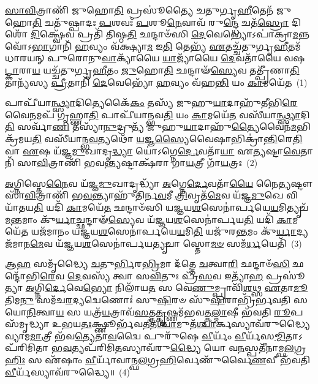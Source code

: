 \setcounter{anuvakam}{0}
\-\ul{𑌸𑌾}\-\-\ul{𑌵𑌿}\-𑌤𑍍𑌰𑌾𑌣𑌿᳴ 𑌜𑍁𑌹𑍋\-\ul{𑌤𑌿} 𑌪𑍍𑌰𑌸𑍂॑𑌤𑍍𑌯𑍈 𑌚𑌤𑍁𑌰𑍍𑌗𑍃\-\ul{𑌹𑍀}\-𑌤𑍇𑌨᳴ 𑌜𑍁𑌹𑍋\-\ul{𑌤𑌿} 𑌚𑌤𑍁᳴𑌷𑍍𑌪𑌾𑌦𑌃 \ul{𑌪}\-𑌶𑌵𑌃᳴ \ul{𑌪}\-𑌶𑍂\-\ul{𑌨𑍇}\-𑌵𑌾𑌵᳴ 𑌰𑍁\-\ul{𑌨𑍍𑌦𑍍𑌧𑍇} 𑌚𑌤᳴\-\ul{𑌸𑍍𑌰𑍋} 𑌦𑌿𑌶𑍋᳴ \ul{𑌦𑌿}\-𑌕𑍍𑌷𑍍𑌵𑍇᳴𑌵 𑌪𑍍𑌰𑌤𑌿᳴ 𑌤𑌿𑌷𑍍𑌠\-\ul{𑌤𑌿} 𑌛𑌨𑍍𑌦𑌾𑍞᳴𑌸𑌿 \ul{𑌦𑍇}\-𑌵𑍇𑌭𑍍𑌯𑍋\-𑌽𑌪𑌾॑𑌕𑍍𑌰𑌾\-\ul{𑌮}\-𑌨𑍍𑌨 𑌵𑍋᳴\-𑌽\-\ul{𑌭𑌾}\-𑌗𑌾𑌨𑌿᳴ \ul{𑌹}\-𑌵𑍍𑌯𑌂 𑌵᳴𑌕𑍍𑌷𑍍𑌯𑌾\-\ul{𑌮} 𑌇\-\ul{𑌤𑌿} 𑌤𑍇𑌭𑍍𑌯᳴ \ul{𑌏}\-𑌤𑌚𑍍𑌚᳴𑌤𑍁𑌰𑍍𑌗𑍃\-\ul{𑌹𑍀}\-𑌤𑌮᳴𑌧𑌾𑌰𑌯𑌨𑍍 𑌪𑍁𑌰𑍋𑌨𑍁\-\ul{𑌵𑌾}\-𑌕𑍍𑌯𑌾᳴𑌯𑍈 \ul{𑌯𑌾}\-𑌜𑍍𑌯𑌾᳴𑌯𑍈 \ul{𑌦𑍇}\-𑌵𑌤𑌾᳴𑌯𑍈 𑌵𑌷\-\ul{𑌟𑍍𑌕𑌾}\-𑌰𑌾\-\ul{𑌯} 𑌯𑌚𑍍𑌚᳴𑌤𑍁𑌰𑍍𑌗𑍃\-\ul{𑌹𑍀}\-𑌤𑌂 \ul{𑌜𑍁}\-𑌹𑍋\-\ul{𑌤𑌿} 𑌛𑌨𑍍𑌦𑌾𑍟᳴\-\ul{𑌸𑍍𑌯𑍇}\-𑌵 𑌤𑌤𑍍𑌪𑍍𑌰𑍀᳴𑌣𑌾\-\ul{𑌤𑌿} 𑌤𑌾𑌨𑍍𑌯᳴𑌸𑍍𑌯 \ul{𑌪𑍍𑌰𑍀}\-𑌤𑌾𑌨𑌿᳴ \ul{𑌦𑍇}\-𑌵𑍇𑌭𑍍𑌯𑍋᳴ \ul{𑌹}\-𑌵𑍍𑌯𑌂 𑌵᳴𑌹\-\ul{𑌨𑍍𑌤𑌿} 𑌯𑌂 \ul{𑌕𑌾}\-𑌮𑌯𑍇᳴𑌤~(1)

𑌪𑌾𑌪𑍀᳴𑌯𑌾\-\ul{𑌨𑍍𑌥𑍍𑌸𑍍𑌯𑌾}\-𑌦𑌿𑌤𑍍𑌯𑍇𑌕𑍈᳴\-\ul{𑌕𑌂} 𑌤𑌸𑍍𑌯᳴ 𑌜𑍁𑌹𑍁\-\ul{𑌯𑌾}\-𑌦𑌾𑌹𑍁᳴𑌤𑍀𑌭𑌿\-\ul{𑌰𑍇}\-𑌵𑍈\-\ul{𑌨}\-𑌮𑌪᳴ 𑌗𑍃𑌹𑍍𑌣𑌾\-\ul{𑌤𑌿} 𑌪𑌾𑌪𑍀᳴𑌯𑌾𑌨𑍍𑌭𑌵\-\ul{𑌤𑌿} 𑌯𑌂 \ul{𑌕𑌾}\-𑌮𑌯𑍇᳴\-\ul{𑌤} 𑌵𑌸𑍀᳴𑌯𑌾\-\ul{𑌨𑍍𑌥𑍍𑌸𑍍𑌯𑌾}\-𑌦𑌿\-\ul{𑌤𑌿} 𑌸𑌰𑍍𑌵𑌾᳴\-\ul{𑌣𑌿} 𑌤𑌸𑍍𑌯𑌾᳴\-\ul{𑌨𑍁}\-𑌦𑍍𑌰𑍁𑌤𑍍𑌯᳴ 𑌜𑍁𑌹𑍁\-\ul{𑌯𑌾}\-𑌦𑌾𑌹𑍁᳴\-\ul{𑌤𑍍𑌯𑍈}\-𑌵𑍈𑌨᳴\-\ul{𑌮}\-𑌭𑌿 𑌕𑍍𑌰᳴𑌮𑌯\-\ul{𑌤𑌿} 𑌵𑌸𑍀᳴𑌯𑌾𑌨𑍍𑌭\-\ul{𑌵}\-𑌤𑍍𑌯𑌥𑍋᳴ \ul{𑌯}\-𑌜𑍍𑌞\-\ul{𑌸𑍍𑌯𑍈}\-𑌵𑍈𑌷𑌾𑌭𑌿𑌕𑍍𑌰𑌾॑\-\ul{𑌨𑍍𑌤𑌿}\-𑌰𑍇\-\ul{𑌤𑌿} 𑌵𑌾 \ul{𑌏}\-𑌷 𑌯᳴𑌜𑍍𑌞\-\ul{𑌮𑍁}\-𑌖𑌾𑌦𑍃\-\ul{𑌦𑍍𑌧𑍍𑌯𑌾} 𑌯𑍋॑\-𑌽𑌗𑍍𑌨𑍇\-\ul{𑌰𑍍𑌦𑍇}\-𑌵𑌤𑌾᳴\-\ul{𑌯𑌾} 𑌏\-\ul{𑌤𑍍𑌯}\-𑌷𑍍𑌟𑌾\-\ul{𑌵𑍇}\-𑌤𑌾𑌨𑌿᳴ 𑌸𑌾\-\ul{𑌵𑌿}\-𑌤𑍍𑌰𑌾𑌣𑌿᳴ 𑌭𑌵\-\ul{𑌨𑍍𑌤𑍍𑌯}\-𑌷𑍍𑌟𑌾𑌕𑍍𑌷᳴𑌰𑌾 𑌗𑌾\-\ul{𑌯}\-𑌤𑍍𑌰𑍀 𑌗𑌾᳴\-\ul{𑌯}\-𑌤𑍍𑌰𑌃~(2)

\-\ul{𑌅}\-𑌗𑍍𑌨𑌿𑌸𑍍𑌤𑍇\-\ul{𑌨𑍈}\-𑌵 𑌯᳴𑌜𑍍𑌞\-\ul{𑌮𑍁}\-𑌖𑌾𑌦𑍃𑌦𑍍𑌧𑍍𑌯𑌾᳴ \ul{𑌅}\-𑌗𑍍𑌨𑍇\-\ul{𑌰𑍍𑌦𑍇}\-𑌵𑌤𑌾᳴\-\ul{𑌯𑍈} 𑌨𑍈\-\ul{𑌤𑍍𑌯}\-𑌷𑍍𑌟𑍗 𑌸𑌾᳴\-\ul{𑌵𑌿}\-𑌤𑍍𑌰𑌾𑌣𑌿᳴ 𑌭\-\ul{𑌵}\-𑌨𑍍𑌤𑍍𑌯𑌾𑌹𑍁᳴𑌤𑌿𑌰𑍍𑌨\-\ul{𑌵}\-𑌮𑍀 \ul{𑌤𑍍𑌰𑌿}\-𑌵𑍃𑌤᳴\-\ul{𑌮𑍇}\-𑌵 𑌯᳴𑌜𑍍𑌞\-\ul{𑌮𑍁}\-𑌖𑍇 𑌵𑌿 𑌯𑌾᳴𑌤𑌯\-\ul{𑌤𑌿} 𑌯𑌦𑌿᳴ \ul{𑌕𑌾}\-𑌮𑌯𑍇᳴\-\ul{𑌤} 𑌛𑌨𑍍𑌦𑌾𑍞᳴𑌸𑌿 𑌯𑌜𑍍𑌞𑌯\-\ul{𑌶}\-𑌸𑍇𑌨𑌾॑𑌰𑍍𑌪𑌯𑍇\-\ul{𑌯}\-𑌮𑌿𑌤𑍍𑌯𑍃𑌚᳴𑌮\-\ul{𑌨𑍍𑌤}\-𑌮𑌾𑌂 𑌕𑍁᳴\-\ul{𑌰𑍍𑌯𑌾}\-𑌚𑍍𑌛𑌨𑍍𑌦𑌾𑍟᳴\-\ul{𑌸𑍍𑌯𑍇}\-𑌵 𑌯᳴𑌜𑍍𑌞𑌯\-\ul{𑌶}\-𑌸𑍇𑌨𑌾॑𑌰𑍍𑌪𑌯\-\ul{𑌤𑌿} 𑌯𑌦𑌿᳴ \ul{𑌕𑌾}\-𑌮𑌯𑍇᳴\-\ul{𑌤} 𑌯𑌜᳴𑌮𑌾𑌨𑌂 𑌯𑌜𑍍𑌞𑌯\-\ul{𑌶}\-𑌸𑍇𑌨𑌾॑𑌰𑍍𑌪𑌯𑍇\-\ul{𑌯}\-𑌮𑌿\-\ul{𑌤𑌿} 𑌯𑌜𑍁᳴𑌰\-\ul{𑌨𑍍𑌤}\-𑌮𑌂 𑌕𑍁᳴\-\ul{𑌰𑍍𑌯𑌾}\-𑌦𑍍𑌯𑌜᳴𑌮𑌾𑌨\-\ul{𑌮𑍇}\-𑌵 𑌯᳴𑌜𑍍𑌞𑌯\-\ul{𑌶}\-𑌸𑍇𑌨𑌾॑𑌰𑍍𑌪𑌯\-\ul{𑌤𑍍𑌯𑍃}\-𑌚𑌾 𑌸𑍍𑌤𑍋\-\ul{𑌮}\-\-\ul{𑍞} 𑌸𑌮᳴\-\ul{𑌰𑍍𑌧}\-𑌯𑍇𑌤𑌿᳴~(3)

\-\ul{𑌆}\-\-\ul{𑌹} 𑌸𑌮𑍃᳴𑌦𑍍𑌧𑍍𑌯𑍈 \ul{𑌚}\-𑌤𑍁\-\ul{𑌰𑍍𑌭𑌿}\-𑌰\-\ul{𑌭𑍍𑌰𑌿}\-𑌮𑌾 𑌦᳴𑌤𑍍𑌤𑍇 \ul{𑌚}\-𑌤𑍍𑌵𑌾\-\ul{𑌰𑌿} 𑌛𑌨𑍍𑌦𑌾𑍞᳴\-\ul{𑌸𑌿} 𑌛𑌨𑍍𑌦𑍋᳴𑌭𑌿\-\ul{𑌰𑍇}\-𑌵 \ul{𑌦𑍇}\-𑌵𑌸𑍍𑌯᳴ 𑌤𑍍𑌵𑌾 𑌸\-\ul{𑌵𑌿}\-𑌤𑍁𑌃 𑌪𑍍𑌰᳴\-\ul{𑌸}\-𑌵 𑌇𑌤𑍍𑌯𑌾᳴\-\ul{𑌹} 𑌪𑍍𑌰𑌸𑍂॑𑌤𑍍𑌯𑌾 \ul{𑌅}\-𑌗𑍍𑌨𑌿\-\ul{𑌰𑍍𑌦𑍇}\-𑌵𑍇\-\ul{𑌭𑍍𑌯𑍋} 𑌨𑌿𑌲𑌾᳴𑌯\-\ul{𑌤} 𑌸 𑌵𑍇\-\ul{𑌣𑍁}\-𑌮𑍍𑌪𑍍𑌰𑌾𑌵𑌿᳴\-\ul{𑌶}\-𑌥𑍍𑌸 \ul{𑌏}\-𑌤𑌾\-\ul{𑌮𑍂}\-𑌤𑌿𑌮\-\ul{𑌨𑍁} 𑌸𑌮᳴𑌚\-\ul{𑌰}\-𑌦𑍍𑌯𑌦𑍍𑌵𑍇𑌣𑍋𑌃॑ 𑌸𑍁\-\ul{𑌷𑌿}\-𑌰𑍞 𑌸𑍁᳴\-\ul{𑌷𑌿}\-𑌰𑌾𑌭𑍍𑌰𑌿᳴𑌰𑍍𑌭𑌵𑌤𑌿 𑌸𑌯𑍋\-\ul{𑌨𑌿}\-𑌤𑍍𑌵𑌾\-\ul{𑌯} 𑌸 𑌯𑌤𑍍𑌰᳴\-\ul{𑌯}\-𑌤𑍍𑌰𑌾𑌵᳴\-\ul{𑌸}\-𑌤𑍍𑌤\-\ul{𑌤𑍍𑌕𑍃}\-𑌷𑍍𑌣𑌮᳴𑌭𑌵𑌤𑍍𑌕\-\ul{𑌲𑍍𑌮𑌾}\-𑌷𑍀 𑌭᳴𑌵𑌤𑌿 \ul{𑌰𑍂}\-𑌪𑌸᳴𑌮𑍃𑌦𑍍𑌧𑍍𑌯𑌾 𑌉𑌭𑌯\-\ul{𑌤𑌃}\-𑌕𑍍𑌷𑍍𑌣𑍂𑌰𑍍𑌭᳴𑌵\-\ul{𑌤𑍀}\-𑌤\-\ul{𑌶𑍍𑌚𑌾}\-𑌮𑍁𑌤᳴\-\ul{𑌶𑍍𑌚𑌾}\-𑌰𑍍𑌕𑌸𑍍𑌯𑌾𑌵᳴𑌰𑍁𑌦𑍍𑌧𑍍𑌯𑍈 𑌵𑍍𑌯𑌾𑌮\-\ul{𑌮𑌾}\-𑌤𑍍𑌰𑍀 𑌭᳴𑌵\-\ul{𑌤𑍍𑌯𑍇}\-𑌤𑌾\-\ul{𑌵}\-𑌦𑍍𑌵𑍈 𑌪𑍁𑌰𑍁᳴𑌷𑍇 \ul{𑌵𑍀}\-𑌰𑍍𑌯𑌂᳴ \ul{𑌵𑍀}\-𑌰𑍍𑌯᳴𑌸\-\ul{𑌮𑍍𑌮𑌿}\-𑌤𑌾\-𑌽𑌪᳴𑌰𑌿𑌮𑌿𑌤𑌾 𑌭\-\ul{𑌵}\-𑌤𑍍𑌯𑌪᳴𑌰𑌿𑌮𑌿\-\ul{𑌤}\-𑌸𑍍𑌯𑌾𑌵᳴𑌰𑍁\-\ul{𑌦𑍍𑌧𑍍𑌯𑍈} 𑌯𑍋 𑌵\-\ul{𑌨}\-𑌸𑍍𑌪𑌤𑍀᳴𑌨𑌾𑌮𑍍𑌫\-\ul{𑌲}\-𑌗𑍍𑌰\-\ul{𑌹𑌿𑌃} 𑌸 𑌏᳴𑌷𑌾𑌂 \ul{𑌵𑍀}\-𑌰𑍍𑌯𑌾᳴𑌵𑌾𑌨𑍍𑌫\-\ul{𑌲}\-𑌗𑍍𑌰\-\ul{𑌹𑌿}\-𑌰𑍍𑌵𑍇𑌣𑍁᳴𑌰𑍍𑌵𑍈\-\ul{𑌣}\-𑌵𑍀 𑌭᳴𑌵𑌤𑌿 \ul{𑌵𑍀}\-𑌰𑍍𑌯᳴𑌸𑍍𑌯𑌾𑌵᳴𑌰𑍁𑌦𑍍𑌧𑍍𑌯𑍈॥~(4)

